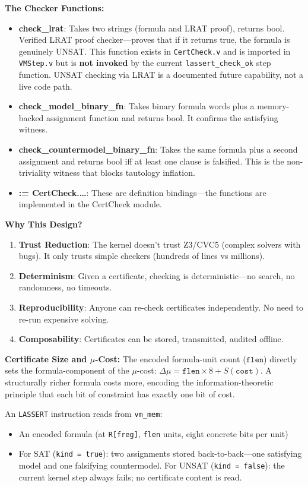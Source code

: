 \textbf{The Checker Functions:}
\begin{itemize}
    \item \textbf{check\_lrat}: Takes two strings (formula and LRAT proof), returns bool. Verified LRAT proof checker---proves that if it returns true, the formula is genuinely UNSAT. This function exists in \texttt{CertCheck.v} and is imported in \texttt{VMStep.v} but is \textbf{not invoked} by the current \texttt{lassert\_check\_ok} step function. UNSAT checking via LRAT is a documented future capability, not a live code path.
    \item \textbf{check\_model\_binary\_fn}: Takes binary formula words plus a memory-backed assignment function and returns bool. It confirms the satisfying witness.
    \item \textbf{check\_countermodel\_binary\_fn}: Takes the same formula plus a second assignment and returns bool iff at least one clause is falsified. This is the non-triviality witness that blocks tautology inflation.
    \item \textbf{:= CertCheck.\ldots}: These are definition bindings—the functions are implemented in the CertCheck module.
\end{itemize}

\textbf{Why This Design?}
\begin{enumerate}
    \item \textbf{Trust Reduction}: The kernel doesn't trust Z3/CVC5 (complex solvers with bugs). It only trusts simple checkers (hundreds of lines vs millions).
    \item \textbf{Determinism}: Given a certificate, checking is deterministic—no search, no randomness, no timeouts.
    \item \textbf{Reproducibility}: Anyone can re-check certificates independently. No need to re-run expensive solving.
    \item \textbf{Composability}: Certificates can be stored, transmitted, audited offline.
\end{enumerate}

\textbf{Certificate Size and $\mu$-Cost:} The encoded formula-unit count ($\mathtt{flen}$) directly sets the formula-component of the $\mu$-cost: $\Delta\mu = \mathtt{flen} \times 8 + S(\mathtt{cost})$. A structurally richer formula costs more, encoding the information-theoretic principle that each bit of constraint has exactly one bit of cost.

An \texttt{LASSERT} instruction reads from \texttt{vm\_mem}:
\begin{itemize}
    \item An encoded formula (at \texttt{R[freg]}, \texttt{flen} units, eight concrete bits per unit)
    \item For SAT (\texttt{kind = true}): two assignments stored back-to-back---one satisfying model and one falsifying countermodel. For UNSAT (\texttt{kind = false}): the current kernel step always fails; no certificate content is read.
\end{itemize}


